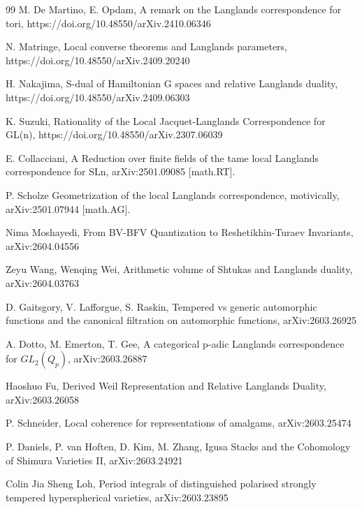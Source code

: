 \documentclass[a4paper]{jpconf}
\begin{document}
\begin{thebibliography}{99}
M. De Martino, E. Opdam,
A remark on the Langlands correspondence for tori,
https://doi.org/10.48550/arXiv.2410.06346


 N. Matringe,
Local converse theorems and Langlands parameters,
https://doi.org/10.48550/arXiv.2409.20240

 H. Nakajima,
S-dual of Hamiltonian G spaces and relative Langlands duality,
https://doi.org/10.48550/arXiv.2409.06303

 K. Suzuki,
Rationality of the Local Jacquet-Langlands Correspondence for GL(n),
https://doi.org/10.48550/arXiv.2307.06039


%

 E. Collacciani,
A Reduction over finite fields of the tame local Langlands correspondence for SLn,
	arXiv:2501.09085 [math.RT].

 P. Scholze
Geometrization of the local Langlands correspondence, motivically,
	arXiv:2501.07944 [math.AG].

 Nima Moshayedi,
From BV-BFV Quantization to Reshetikhin-Turaev Invariants,
arXiv:2604.04556


 Zeyu Wang, Wenqing Wei,
Arithmetic volume of Shtukas and Langlands duality,
arXiv:2604.03763







D. Gaitsgory, V. Lafforgue, S. Raskin,
Tempered vs generic automorphic functions and the canonical filtration on automorphic functions,
arXiv:2603.26925




A. Dotto, M. Emerton, T. Gee,
A categorical p-adic Langlands correspondence for $GL_2(Q_p)$,
 arXiv:2603.26887



 Haoshuo Fu,
Derived Weil Representation and Relative Langlands Duality,
arXiv:2603.26058




 P. Schneider,
Local coherence for representations of amalgams,
arXiv:2603.25474





P. Daniels, P. van Hoften, D. Kim, M. Zhang,
Igusa Stacks and the Cohomology of Shimura Varieties II,
arXiv:2603.24921



 Colin Jia Sheng Loh,
Period integrals of distinguished polarised strongly tempered hyperspherical varieties,
 arXiv:2603.23895




\end{thebibliography}
\end{document}
